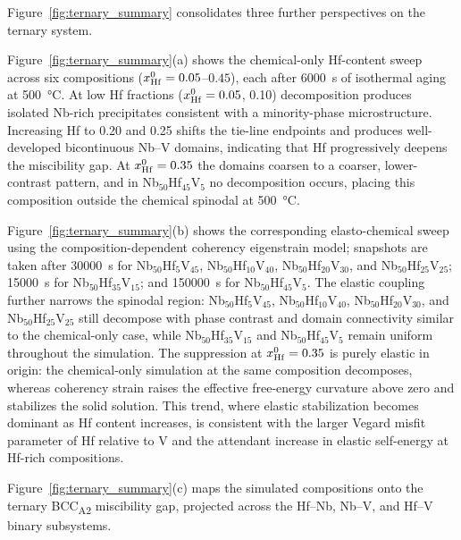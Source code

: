Figure~\ref{fig:ternary_summary} consolidates three further perspectives on the ternary system.
{\color{blue}
Figure~\ref{fig:ternary_summary}(a) shows the chemical-only Hf-content sweep across six compositions ($x_{\rm Hf}^0 = 0.05$--$0.45$), each after \SI{6000}{\second} of isothermal aging at \SI{500}{\celsius}.
At low Hf fractions ($x_{\rm Hf}^0 = 0.05$, 0.10) decomposition produces isolated Nb-rich precipitates consistent with a minority-phase microstructure.
Increasing Hf to 0.20 and 0.25 shifts the tie-line endpoints and produces well-developed bicontinuous Nb--V domains, indicating that Hf progressively deepens the miscibility gap.
At $x_{\rm Hf}^0 = 0.35$ the domains coarsen to a coarser, lower-contrast pattern, and in Nb$_{50}$Hf$_{45}$V$_{5}$ no decomposition occurs, placing this composition outside the chemical spinodal at \SI{500}{\celsius}.

Figure~\ref{fig:ternary_summary}(b) shows the corresponding elasto-chemical sweep using the composition-dependent coherency eigenstrain model; snapshots are taken after \SI{30000}{\second} for Nb$_{50}$Hf$_{5}$V$_{45}$, Nb$_{50}$Hf$_{10}$V$_{40}$, Nb$_{50}$Hf$_{20}$V$_{30}$, and Nb$_{50}$Hf$_{25}$V$_{25}$; \SI{15000}{\second} for Nb$_{50}$Hf$_{35}$V$_{15}$; and \SI{150000}{\second} for Nb$_{50}$Hf$_{45}$V$_{5}$.
The elastic coupling further narrows the spinodal region: Nb$_{50}$Hf$_{5}$V$_{45}$, Nb$_{50}$Hf$_{10}$V$_{40}$, Nb$_{50}$Hf$_{20}$V$_{30}$, and Nb$_{50}$Hf$_{25}$V$_{25}$ still decompose with phase contrast and domain connectivity similar to the chemical-only case, while Nb$_{50}$Hf$_{35}$V$_{15}$ and Nb$_{50}$Hf$_{45}$V$_{5}$ remain uniform throughout the simulation.
The suppression at $x_{\rm Hf}^0 = 0.35$ is purely elastic in origin: the chemical-only simulation at the same composition decomposes, whereas coherency strain raises the effective free-energy curvature above zero and stabilizes the solid solution.
This trend, where elastic stabilization becomes dominant as Hf content increases, is consistent with the larger Vegard misfit parameter of Hf relative to V and the attendant increase in elastic self-energy at Hf-rich compositions.} Figure~\ref{fig:ternary_summary}(c) maps the simulated compositions onto the ternary BCC\textsubscript{A2} miscibility gap, projected across the Hf--Nb, Nb--V, and Hf--V binary subsystems.

